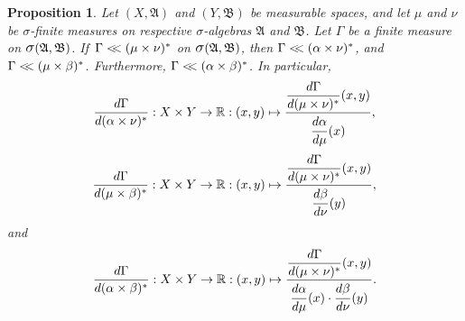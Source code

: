 \documentclass[
twoside=true,
paper=letter,
fontsize=9pt,
pagesize=auto,
leqno,
openany,
headsepline,
overfullrule,
]{scrbook}
\theoremstyle{plain}
\theoremstyle{plain}
\newtheorem{prop}[thm]{Proposition}
\theoremstyle{definition}
\theoremstyle{bfnoteitalic}
\theoremstyle{bfnoteroman}
\newcommand{\sigalg}[1]{\mathfrak{#1}}
\newcommand{\sagb}{\mathop{\hbox{\large{$\sigma$}}}\nolimits}
\newcommand{\textsigma}{\hbox{\large{$\sigma$}}\kern-1pt}
\newcommand{\R}{\mathbb{R}}
\newcommand{\sigmaalgebra}{\sigalg{A}}
\newcommand{\sigmaalgebraii}{\sigalg{B}}
\newcommand{\productsig}[2]{\sagb(#1,#2)}
\newcommand{\lilstrut}{\vphantom{\bigl(}}
\newcommand{\measurespace}{X}
\newcommand{\measurespaceii}{Y}
\newcommand{\mspaceelt}{x}
\newcommand{\mspaceeltii}{y}
\newcommand{\abscont}{\mathrel{< \kern-3.5pt <}}
\newcommand{\measure}{\mu}
\newcommand{\measmu}{\mu}
\newcommand{\measureii}{\nu}
\newcommand{\measnu}{\nu}
\newcommand{\joint}{\Gamma}%
\newcommand{\measonprod}{\Gamma}%
\newcommand{\marginalone}{\alpha}%
\newcommand{\marginaltwo}{\beta}%
\begin{document}
\begin{prop}\label{joint_abscont}
Let 
$(\measurespace, \sigmaalgebra)$
and
$(\measurespaceii, \sigmaalgebraii)$
be measurable spaces, and let $\measure$ and $\measureii$
be \textsigma-finite measures on  respective \textsigma-algebras
$\sigmaalgebra$ and $\sigmaalgebraii$.
Let $\measonprod$ be a finite measure on 
$\productsig{\sigmaalgebra}{\sigmaalgebraii}$.
If\,
$\measonprod \abscont (\measure\times\measureii)^*$
on
$\productsig{\sigmaalgebra}{\sigmaalgebraii}$,
then 
$\measonprod \abscont (\marginalone\times\measureii)^*$,
and
$\measonprod \abscont (\measure\times\marginaltwo)^*$.
Furthermore,
$\measonprod \abscont (\marginalone\times\marginaltwo)^*$.
In particular,
\[
\frac{d\measonprod}{d(\marginalone\times\measnu)^*}
: \measurespace\times\measurespaceii
\to \R
: (\mspaceelt,\mspaceeltii)\mapsto
\frac{\dfrac{d\joint}{d(\measmu\times\measnu)^*}
(\mspaceelt,\mspaceeltii)}
{\dfrac{d\marginalone\lilstrut}{d\measmu}(\mspaceelt)},
\]
\[
\frac{d\measonprod}{d(\measmu\times\marginaltwo)^*}
: \measurespace\times\measurespaceii
\to \R
: (\mspaceelt,\mspaceeltii)\mapsto
\frac{\dfrac{d\joint}{d(\measmu\times\measnu)^*}
(\mspaceelt,\mspaceeltii)}
{\dfrac{d\marginaltwo\lilstrut}{d\measnu}(\mspaceeltii)},
\]
and
\[
\frac{d\measonprod}{d(\marginalone\times\marginaltwo)^*}
: \measurespace\times\measurespaceii
\to \R
: (\mspaceelt,\mspaceeltii)\mapsto
\frac{\dfrac{d\joint}{d(\measmu\times\measnu)^*}
(\mspaceelt,\mspaceeltii)}
{\dfrac{d\marginalone\lilstrut}{d\measmu}(\mspaceelt)
\cdot
\dfrac{d\marginaltwo\lilstrut}{d\measnu}(\mspaceeltii)}.
\]
\end{prop}
\end{document}
